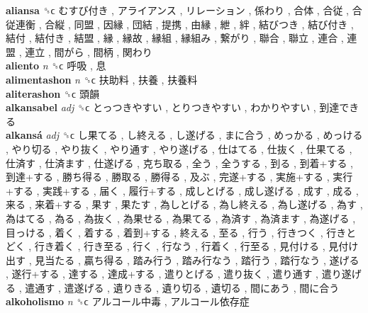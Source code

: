 \textbf{aliansa} ␝ϲ   むすび付き ,  アライアンス ,  リレーション ,  係わり ,  合体 ,  合従 ,  合従連衡 ,  合縦 ,  同盟 ,  因縁 ,  団結 ,  提携 ,  由縁 ,  紲 ,  絆 ,  結びつき ,  結び付き ,  結付 ,  結付き ,  結盟 ,  縁 ,  縁故 ,  縁組 ,  縁組み ,  繋がり ,  聯合 ,  聯立 ,  連合 ,  連盟 ,  連立 ,  間がら ,  間柄 ,  関わり   \\
\textbf{aliento} \emph{n}  ␝ϲ   呼吸 ,  息   \\
\textbf{alimentashon} \emph{n}  ␝ϲ   扶助料 ,  扶養 ,  扶養料   \\
\textbf{aliterashon} ␝ϲ   頭韻   \\
\textbf{alkansabel} \emph{adj}  ␝ϲ   とっつきやすい ,  とりつきやすい ,  わかりやすい ,  到達できる   \\
\textbf{alkansá} \emph{adj}  ␝ϲ   し果てる ,  し終える ,  し遂げる ,  まに合う ,  めっかる ,  めっける ,  やり切る ,  やり抜く ,  やり通す ,  やり遂げる ,  仕はてる ,  仕抜く ,  仕果てる ,  仕済す ,  仕済ます ,  仕遂げる ,  克ち取る ,  全う ,  全うする ,  到る ,  到着+する ,  到達+する ,  勝ち得る ,  勝取る ,  勝得る ,  及ぶ ,  完遂+する ,  実施+する ,  実行+する ,  実践+する ,  届く ,  履行+する ,  成しとげる ,  成し遂げる ,  成す ,  成る ,  来る ,  来着+する ,  果す ,  果たす ,  為しとげる ,  為し終える ,  為し遂げる ,  為す ,  為はてる ,  為る ,  為抜く ,  為果せる ,  為果てる ,  為済す ,  為済ます ,  為遂げる ,  目っける ,  着く ,  着する ,  着到+する ,  終える ,  至る ,  行う ,  行きつく ,  行きとどく ,  行き着く ,  行き至る ,  行く ,  行なう ,  行着く ,  行至る ,  見付ける ,  見付け出す ,  見当たる ,  贏ち得る ,  踏み行う ,  踏み行なう ,  踏行う ,  踏行なう ,  遂げる ,  遂行+する ,  達する ,  達成+する ,  遣りとげる ,  遣り抜く ,  遣り通す ,  遣り遂げる ,  遣通す ,  遣遂げる ,  遺りきる ,  遺り切る ,  遺切る ,  間にあう ,  間に合う   \\
\textbf{alkoholismo} \emph{n}  ␝ϲ   アルコール中毒 ,  アルコール依存症   \\
